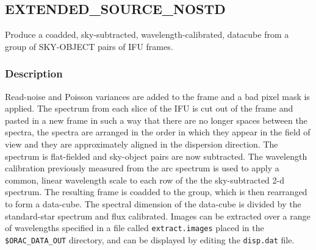 \documentclass[twoside,11pt,nolof]{starlink}
\begin{document}
\clearpage


\subsection{EXTENDED\_SOURCE\_NOSTD}

Produce a coadded, sky-subtracted, wavelength-calibrated,
datacube from a group of SKY-OBJECT pairs of IFU
frames.

\subsubsection*{Description}

Read-noise and Poisson variances are added to the frame and a bad
pixel mask is applied. The spectrum from each slice of the IFU is cut
out of the frame and pasted in a new frame in such a way that there
are no longer spaces between the spectra, the spectra are arranged in
the order in which they appear in the field of view and they are
approximately aligned in the dispersion direction. The spectrum is
flat-fielded and sky-object pairs are now subtracted.  The wavelength
calibration previously measured from the arc spectrum is used to apply
a common, linear wavelength scale to each row of the the
sky-subtracted 2-d spectrum.  The resulting frame is coadded to the
group, which is then rearranged to form a data-cube. The spectral
dimension of the data-cube is divided by the standard-star spectrum
and flux calibrated. Images can be extracted over a range of
wavelengths specified in a file called \texttt{extract.images} placed in
the \texttt{\$ORAC\_DATA\_OUT} directory, and can be displayed by editing
the \texttt{disp.dat} file.
\end{document}
